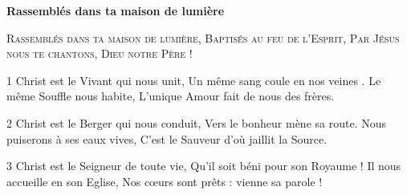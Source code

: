 \textbf{Rassemblés dans ta maison de lumière}

\textsc{Rassemblés dans ta maison de lumière, Baptisés au feu de l’Esprit,
Par Jésus nous te chantons, Dieu notre Père !}

1 Christ est le Vivant qui nous unit, Un même sang coule en nos veines .
Le même Souffle nous habite, L’unique Amour fait de nous des frères.

2 Christ est le Berger qui nous conduit, Vers le bonheur mène sa route.
Nous puiserons à ses eaux vives, C’est le Sauveur d’où jaillit la Source.

3 Christ est le Seigneur de toute vie, Qu’il soit béni pour son Royaume !
Il nous accueille en son Eglise, Nos cœurs sont prêts : vienne sa parole !

